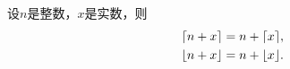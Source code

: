 \begin{proposition}
设\(n\)是整数，\(x\)是实数，则\begin{gather*}
	\lceil n+x\rceil = n + \lceil x\rceil,
	\label{equation:取整函数.取整函数的周期性1} \\
	\lfloor n+x\rfloor = n + \lfloor x\rfloor.
	\label{equation:取整函数.取整函数的周期性2}
\end{gather*}
\end{proposition}

